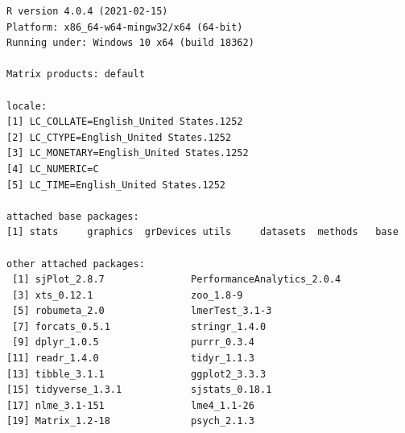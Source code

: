 \documentclass[
  english,
]{book}
\begin{document}
\begin{verbatim}
R version 4.0.4 (2021-02-15)
Platform: x86_64-w64-mingw32/x64 (64-bit)
Running under: Windows 10 x64 (build 18362)

Matrix products: default

locale:
[1] LC_COLLATE=English_United States.1252 
[2] LC_CTYPE=English_United States.1252   
[3] LC_MONETARY=English_United States.1252
[4] LC_NUMERIC=C                          
[5] LC_TIME=English_United States.1252    

attached base packages:
[1] stats     graphics  grDevices utils     datasets  methods   base     

other attached packages:
 [1] sjPlot_2.8.7               PerformanceAnalytics_2.0.4
 [3] xts_0.12.1                 zoo_1.8-9                 
 [5] robumeta_2.0               lmerTest_3.1-3            
 [7] forcats_0.5.1              stringr_1.4.0             
 [9] dplyr_1.0.5                purrr_0.3.4               
[11] readr_1.4.0                tidyr_1.1.3               
[13] tibble_3.1.1               ggplot2_3.3.3             
[15] tidyverse_1.3.1            sjstats_0.18.1            
[17] nlme_3.1-151               lme4_1.1-26               
[19] Matrix_1.2-18              psych_2.1.3               


\end{verbatim}
\end{document}

